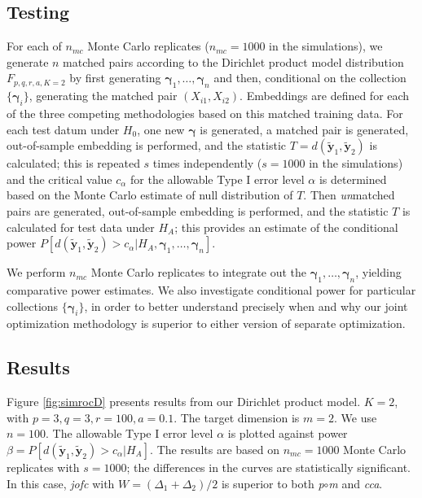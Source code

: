 \documentclass[12pt,xcolor]{article}
\newcommand{\1}{\ensuremath{\mbox{{\bf 1}}}}
\begin{document}
\subsection{Testing}

For each of $n_{mc}$ Monte Carlo replicates ($n_{mc}=1000$ in the simulations), we generate $n$ matched pairs
according to the Dirichlet product model distribution $F_{p,q,r,a,K=2}$
by first generating $\bm{\gamma}_1,\ldots,\bm{\gamma}_n$
and then, conditional on the collection $\{\bm{\gamma}_i\}$, generating the matched pair $(X_{i1},X_{i2})$.
Embeddings are defined for each of the three competing methodologies
based on this matched training data.
For each test datum under $H_0$, one new $\bm{\gamma}$ is generated,
a matched pair is generated, out-of-sample embedding is performed,
and the statistic $T=d(\widetilde{\bm{y}}_1,\widetilde{\bm{y}}_2)$ is calculated;
this is repeated $s$ times independently ($s=1000$ in the simulations)
and the critical value $c_{\alpha}$ for the allowable Type I error level $\alpha$
is determined based on the Monte Carlo estimate of null distribution of $T$.
Then {\em un}matched pairs are generated, out-of-sample embedding is performed,
and the statistic $T$ is calculated for test data under $H_A$;
this provides an estimate of the conditional power
$P[d(\widetilde{\bm{y}}_1,\widetilde{\bm{y}}_2)>c_{\alpha} | H_A,\bm{\gamma}_1,\ldots,\bm{\gamma}_n]$.

We perform $n_{mc}$ Monte Carlo replicates to integrate out the $\bm{\gamma}_1,\ldots,\bm{\gamma}_n$,
yielding comparative power estimates.
We also investigate conditional power for particular collections $\{\bm{\gamma}_i\}$,
in order to better understand
precisely when and why our joint optimization methodology is superior to
either version of separate optimization.

\subsection{Results}

Figure \ref{fig:simrocD} presents results
from our Dirichlet product model. $K=2$, with $p=3,q=3,r=100,a=0.1$.
The target dimension is $m=2$. We use $n=100$.
The allowable Type I error level $\alpha$ is plotted against power $\beta = P[d(\widetilde{\bm{y}}_1,\widetilde{\bm{y}}_2)>c_{\alpha} | H_A]$.
The results are based on $n_{mc}=1000$ Monte Carlo replicates with $s=1000$;
the differences in the curves are statistically significant.
In this case, {\em jofc} with $W=(\Delta_1 + \Delta_2)/2$ is superior to both {\it p}$\circ${\it m} and {\em cca}.
\end{document}
